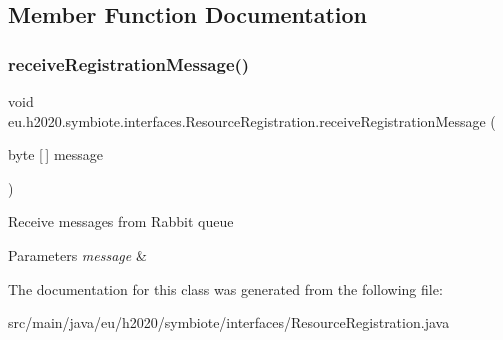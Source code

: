 \subsection{Member Function Documentation}
\mbox{\label{classeu_1_1h2020_1_1symbiote_1_1interfaces_1_1ResourceRegistration_a21a71733e6ea0378c24b4fbda6ba8dfa}} 
\subsubsection{\texorpdfstring{receive\+Registration\+Message()}{receiveRegistrationMessage()}}
{\footnotesize\ttfamily void eu.\+h2020.\+symbiote.\+interfaces.\+Resource\+Registration.\+receive\+Registration\+Message (\begin{DoxyParamCaption}\item[{byte \mbox{[}$\,$\mbox{]}}]{message }\end{DoxyParamCaption})}

Receive messages from Rabbit queue 
\begin{DoxyParams}{Parameters}
{\em message} & \\
\hline
\end{DoxyParams}


The documentation for this class was generated from the following file\+:\begin{DoxyCompactItemize}
\item 
src/main/java/eu/h2020/symbiote/interfaces/Resource\+Registration.\+java\end{DoxyCompactItemize}
